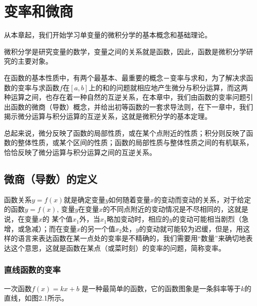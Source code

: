
\chapter{变率和微商}
从本章起，我们开始学习单变量的微积分学的基本概念和基础理论。

微积分学是研究变量的数学，变量之间的关系就是函数，因此，函数是微积分学研究的主要对象。

在函数的基本性质中，有两个最基本、最重要的概念－变率与求和，为了解决求函数的变率与求函数$f$在$[a,b]$上的和的问题就相应地产生微分与积分运算，而这两种运算之间，也存在着一种自然的互逆关系，在本章中，我们由函数的变率问题引出函数的微商（导数）概念，并给出初等函数的一套求导法则，在下一章中，我们揭示微分运算与积分运算的互逆关系，这就是微积分学的基本定理。

总起来说，微分反映了函数的局部性质，或在某个点附近的性质；积分则反映了函数的整体性质，或某个区间的性质；函数的局部性质与整体性质之间的有机联系，恰恰反映了微分运算与积分运算之间的互逆关系。

\section{微商（导数）的定义}
函数关系$y=f(x)$就是确定变量$y$如何随着变量$x$的变动而变动的关系，对于给定的函数$y=f(x)$, 变量$y$在变量$x$的不同点附近的变动情况是不尽相同的，这就是说，在变量$x$的
某个值$x_1$外，当$x_1$略加变动时，相应的$y$的变动可能相当剧烈（急增，或急减）；而在变量$x$的另一个值$x_2$处，$y$的变动就可能较为迟缓，但是，用这样的语言来表达函数在某一点处的变率是不精确的，我们需要用“数量”来确切地表达这个意思，这就是函数在某点（或菜时刻）的变率的问题，简称变率。

\subsection{直线函数的变率}
一次函数$f (x) =kx+b$
是一种最简单的函数，它的函数图象是一条斜率等于$k$的直线，如图2.1所示。
\begin{figure}[htp]
    \centering
{}
    \caption{}
\end{figure}

